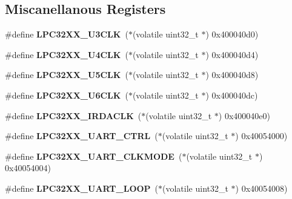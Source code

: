 \subsection*{Miscanellanous Registers}
\begin{DoxyCompactItemize}
\item 
\mbox{\label{group__lpc32xx__reg_ga4b039ad292652973377244f9c57fb3f8}} 
\#define {\bfseries L\+P\+C32\+X\+X\+\_\+\+U3\+C\+LK}~($\ast$(volatile uint32\+\_\+t $\ast$) 0x400040d0)
\item 
\mbox{\label{group__lpc32xx__reg_gadc91840173d8b2dda4f83300399a2bc2}} 
\#define {\bfseries L\+P\+C32\+X\+X\+\_\+\+U4\+C\+LK}~($\ast$(volatile uint32\+\_\+t $\ast$) 0x400040d4)
\item 
\mbox{\label{group__lpc32xx__reg_gac2cebbc76935d7b77fe38d7703a75b7e}} 
\#define {\bfseries L\+P\+C32\+X\+X\+\_\+\+U5\+C\+LK}~($\ast$(volatile uint32\+\_\+t $\ast$) 0x400040d8)
\item 
\mbox{\label{group__lpc32xx__reg_ga25bf6e030836997e3465b577f17882a0}} 
\#define {\bfseries L\+P\+C32\+X\+X\+\_\+\+U6\+C\+LK}~($\ast$(volatile uint32\+\_\+t $\ast$) 0x400040dc)
\item 
\mbox{\label{group__lpc32xx__reg_ga4273d1970cd3ee23dcc0ea6fe81681b6}} 
\#define {\bfseries L\+P\+C32\+X\+X\+\_\+\+I\+R\+D\+A\+C\+LK}~($\ast$(volatile uint32\+\_\+t $\ast$) 0x400040e0)
\item 
\mbox{\label{group__lpc32xx__reg_ga3e079185f0d32da12dffd4583f177f46}} 
\#define {\bfseries L\+P\+C32\+X\+X\+\_\+\+U\+A\+R\+T\+\_\+\+C\+T\+RL}~($\ast$(volatile uint32\+\_\+t $\ast$) 0x40054000)
\item 
\mbox{\label{group__lpc32xx__reg_ga3a61ab909a89f9ddb7876fcce70db6f4}} 
\#define {\bfseries L\+P\+C32\+X\+X\+\_\+\+U\+A\+R\+T\+\_\+\+C\+L\+K\+M\+O\+DE}~($\ast$(volatile uint32\+\_\+t $\ast$) 0x40054004)
\item 
\mbox{\label{group__lpc32xx__reg_ga33c91a39e62549c3d34fdfa10fc978e3}} 
\#define {\bfseries L\+P\+C32\+X\+X\+\_\+\+U\+A\+R\+T\+\_\+\+L\+O\+OP}~($\ast$(volatile uint32\+\_\+t $\ast$) 0x40054008)

\end{DoxyCompactItemize}
